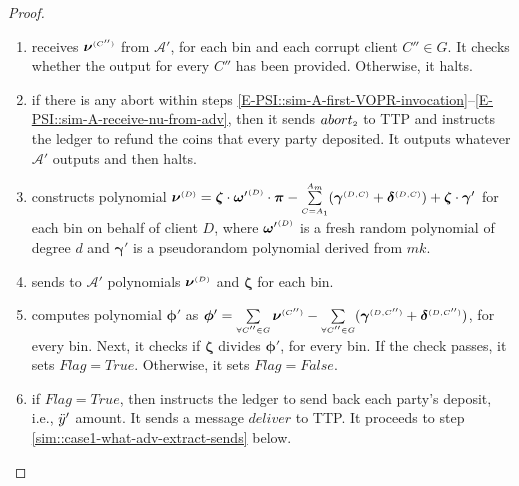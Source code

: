 \begin{proof}
\begin{enumerate}
\begin{enumerate}
%
\item\label{E-PSI::sim-A-receive-nu-from-adv} receives ${\bm\nu}^{ \scriptscriptstyle {  {(C'')}} }$  from $\mathcal{A}'$, for each bin and each corrupt client $C''\in G$. It checks whether the output for every $C''$ has been provided. Otherwise, it halts. 
%
\item if there is any abort within steps \ref{E-PSI::sim-A-first-VOPR-invocation}--\ref{E-PSI::sim-A-receive-nu-from-adv}, then it sends $abort_{\scriptscriptstyle 2}$ to TTP and instructs the ledger to refund the coins that every party deposited.  It outputs whatever $\mathcal{A}'$ outputs and then halts. 
%
\item constructs polynomial  ${\bm\nu}^{ \scriptscriptstyle {  {(D)}}}={\bm\zeta} \cdot  {\bm\omega'}^{ \scriptscriptstyle {  {(D)}}}\cdot {\bm\pi} - \sum\limits^{ \scriptscriptstyle {   A}_{ \scriptscriptstyle {   m}}}_{  \scriptscriptstyle {  {C }= }  \scriptscriptstyle {   A}_{ \scriptscriptstyle {  1}}}({\bm\gamma}^{ \scriptscriptstyle {  {(D,C)}}} + {\bm\delta}^{ \scriptscriptstyle {  {(D,C)}}}) + {\bm\zeta} \cdot {\bm\gamma'}$ for each bin on behalf of client $D$, where ${\bm\omega'}^{ \scriptscriptstyle {  {(D)}}}$ is a fresh random polynomial of degree $d$ and ${\bm\gamma'}$ is a pseudorandom polynomial derived from $ {mk}$.
%
\item sends to $\mathcal{A}'$ polynomials ${\bm\nu}^{ \scriptscriptstyle {  {(D)}}}$ and ${\bm\zeta}$ for each bin. 
%
\item\label{sim::case1-sim-check-res} computes polynomial $ {\bm\phi'}$ as $ {\bm\phi'} = \sum\limits_{\scriptscriptstyle \forall C''\in G}{\bm\nu}^{ \scriptscriptstyle {  {(C'')}} }- \sum\limits_{\scriptscriptstyle \forall C''\in G}({\bm\gamma}^{ \scriptscriptstyle {  {(D,C'')}}} + {\bm\delta}^{ \scriptscriptstyle {  {(D,C'')}}})$, for every bin. Next, it checks if  ${\bm\zeta}$  divides ${\bm\phi'}$, for every bin. If the check passes, it sets $Flag=True$. Otherwise, it sets $Flag=False$. 
%
\item if $Flag=True$, then instructs the ledger to send back each party's deposit, i.e., $\ddot{y}'$ amount. It sends a message $deliver$ to TTP.  It proceeds to step \ref{sim::case1-what-adv-extract-sends} below. 


\end{enumerate}
\end{enumerate}
\end{proof}
